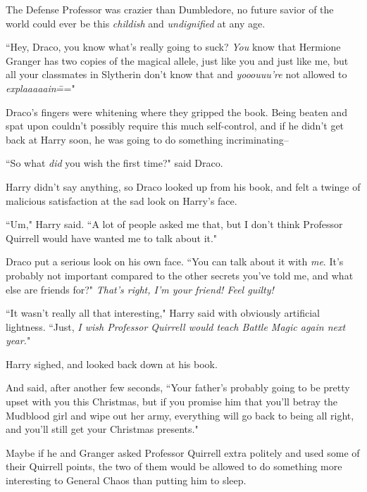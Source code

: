 The Defense Professor was crazier than Dumbledore, no future savior of the world could ever be this \emph{childish} and \emph{undignified} at any age.

``Hey, Draco, you know what's really going to suck? \emph{You} know that Hermione Granger has two copies of the magical allele, just like you and just like me, but all your classmates in Slytherin don't know that and \emph{yooouuu're} not allowed to \emph{explaaaaain}\==="

Draco's fingers were whitening where they gripped the book. Being beaten and spat upon couldn't possibly require this much self-control, and if he didn't get back at Harry soon, he was going to do something incriminating\---

``So what \emph{did} you wish the first time?" said Draco.

Harry didn't say anything, so Draco looked up from his book, and felt a twinge of malicious satisfaction at the sad look on Harry's face.

``Um," Harry said. ``A lot of people asked me that, but I don't think Professor Quirrell would have wanted me to talk about it."

Draco put a serious look on his own face. ``You can talk about it with \emph{me}. It's probably not important compared to the other secrets you've told me, and what else are friends for?" \emph{That's right, I'm your friend! Feel guilty!}

``It wasn't really all that interesting," Harry said with obviously artificial lightness. ``Just, \emph{I wish Professor Quirrell would teach Battle Magic again next year.}"

Harry sighed, and looked back down at his book.

And said, after another few seconds, ``Your father's probably going to be pretty upset with you this Christmas, but if you promise him that you'll betray the Mudblood girl and wipe out her army, everything will go back to being all right, and you'll still get your Christmas presents."

Maybe if he and Granger asked Professor Quirrell extra politely and used some of their Quirrell points, the two of them would be allowed to do something more interesting to General Chaos than putting him to sleep.

